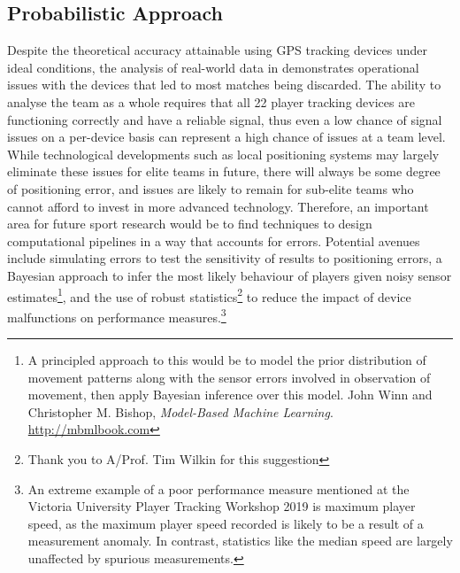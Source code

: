 
\subsection{Probabilistic Approach}

Despite the theoretical accuracy attainable using GPS tracking devices under ideal conditions, the analysis of real-world data in  demonstrates operational issues with the devices that led to most matches being discarded. The ability to analyse the team as a whole requires that all 22 player tracking devices are functioning correctly and have a reliable signal, thus even a low chance of signal issues on a per-device basis can represent a high chance of issues at a team level. While technological developments such as local positioning systems may largely eliminate these issues for elite teams in future, there will always be some degree of positioning error, and issues are likely to remain for sub-elite teams who cannot afford to invest in more advanced technology. Therefore, an important area for future sport research would be to find techniques to design computational pipelines in a way that accounts for errors. Potential avenues include simulating errors to test the sensitivity of results to positioning errors, a Bayesian approach to infer the most likely behaviour of players given noisy sensor estimates\footnote{A principled approach to this would be to model the prior distribution of movement patterns along with the sensor errors involved in observation of movement, then apply Bayesian inference over this model. John Winn and Christopher M. Bishop, \textit{Model-Based Machine Learning}. \url{http://mbmlbook.com}}, and the use of robust statistics\footnote{Thank you to A/Prof. Tim Wilkin for this suggestion} to reduce the impact of device malfunctions on performance measures.\footnote{An extreme example of a poor performance measure mentioned at the Victoria University Player Tracking Workshop 2019 is maximum player speed, as the maximum player speed recorded is likely to be a result of a measurement anomaly. In contrast, statistics like the median speed are largely unaffected by spurious measurements.}

